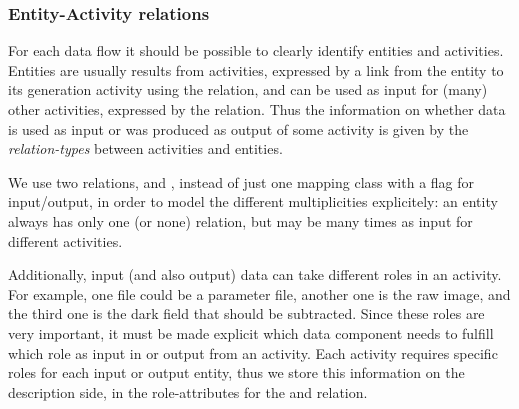



\subsubsection{Entity-Activity relations}\label{sec:entity-activity-relations}

For each data flow it should be possible to clearly identify entities and 
activities. 
Entities are usually results from activities, expressed by a link from 
the entity to its generation activity using the  relation,
and can be used as input for (many) other activities, expressed by the  relation.
Thus the information on whether data is used as input or was produced as output of 
some activity is given by the \emph{relation-types} between activities and entities.

We use two relations,  and , instead of just one
mapping class with a flag for input/output, in order to model the different 
multiplicities explicitely: an entity always has only one (or none) 
 relation, but may be  many times as input for 
different activities.


Additionally, input (and also output) data can take different roles in an 
activity. For example, one file could
be a parameter file, another one is the raw image, and the third one is the 
dark field that should be subtracted. Since these roles are very important, 
it must be made explicit which data component needs to fulfill which role as 
input in or output from an activity.
Each activity requires specific roles for each input or output entity, thus 
we store this information on the description side, in the role-attributes for 
the  and  relation.



